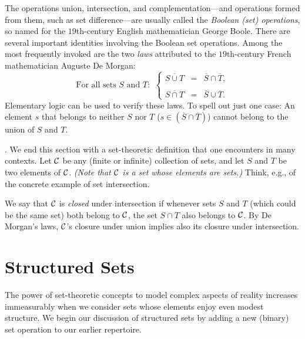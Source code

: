 The operations union, intersection, and complementation---and
operations formed from them, such as set difference---are usually
called the {\em Boolean (set) operations},
 so named for the
$19$th-century English mathematician George Boole.
 There are several important identities involving
the Boolean set operations.  Among the most frequently invoked are the
two {\em laws} attributed to the $19$th-century French mathematician
Auguste De Morgan: 
\begin{equation}
\label{e.de-morgan}
\mbox{For all sets $S$ and $T$: } \ \left\{
\begin{array}{lcl}
\overline{S \cup T} & = & \overline{S} \cap \overline{T}, \\
 \\
\overline{S \cap T} & = & \overline{S} \cup \overline{T}.
\end{array}
\right.
\end{equation}
Elementary logic can be used to verify these laws.  To spell out just
one case: An element $s$ that belongs to neither $S$ nor $T$ ($s \in
\left(\overline{S} \cap \overline{T}\right)$) cannot belong to the
union of $S$ and $T$.

\medskip

.
%
We end this section with a set-theoretic definition that one
encounters in many contexts.  Let $\cal C$ be any (finite or infinite)
collection of sets, and let $S$ and $T$ be two elements of $\cal C$.
{\em (Note that $\cal C$ is a set whose elements are sets.)}  Think,
e.g., of the concrete example of set intersection.

We say that $\cal C$ is {\em closed} under intersection if whenever
sets $S$ and $T$ (which could be the same set) both belong to $\cal
C$, the set $S \cap T$ also belongs to $\cal C$.  By De Morgan's laws,
$\cal C$'s closure under union implies also its closure under
intersection.

\section{Structured Sets}
\label{sec:structured-set}

The power of set-theoretic concepts to model complex aspects of
reality increases immeasurably when we consider sets whose elements
enjoy even modest structure.  We begin our discussion of structured
sets by adding a new (binary) set operation to our earlier repertoire.

